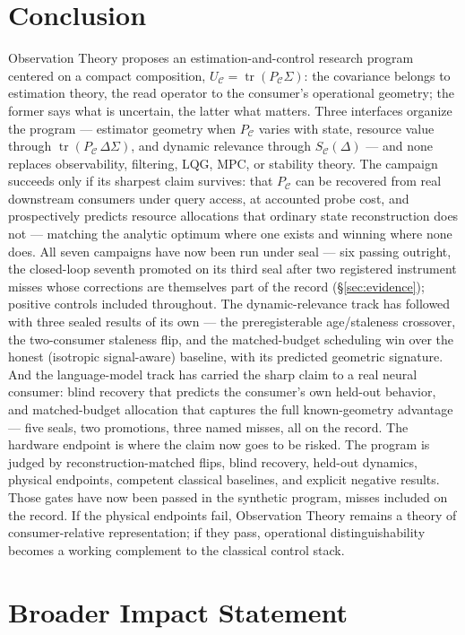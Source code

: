 \documentclass{article}
\theoremstyle{definition}
\theoremstyle{remark}
\newcommand{\PC}{P_{\mathcal{C}}}
\newcommand{\tr}{\operatorname{tr}}
\newcommand{\Sig}{\Sigma}
\newcommand{\UC}{U_{\mathcal{C}}}
\newcommand{\SC}{S_{\mathcal{C}}}
\begin{document}
\section{Conclusion}
\label{sec:conclusion}

Observation Theory proposes an estimation-and-control research program
centered on a compact composition, $\UC=\tr(\PC\Sig)$: the covariance
belongs to estimation theory, the read operator to the consumer's
operational geometry; the former says what is uncertain, the latter what
matters. Three interfaces organize the program --- estimator geometry when
$\PC$ varies with state, resource value through $\tr(\PC\,\Delta\Sig)$, and
dynamic relevance through $\SC(\Delta)$ --- and none replaces observability,
filtering, LQG, MPC, or stability theory. The campaign succeeds only if its
sharpest claim survives: that $\PC$ can be recovered from real downstream
consumers under query access, at accounted probe cost, and prospectively
predicts resource allocations that ordinary state reconstruction does not
--- matching the analytic optimum where one exists and winning where none
does. All seven campaigns have now been run under seal --- six passing
outright, the closed-loop seventh promoted on its third seal after two
registered instrument misses whose corrections are themselves part of the
record (\S\ref{sec:evidence}); positive controls included throughout.
The dynamic-relevance track has followed with three sealed results of
its own --- the preregisterable age/staleness crossover, the
two-consumer staleness flip, and the matched-budget scheduling win over
the honest (isotropic signal-aware) baseline, with its predicted
geometric signature. And the language-model track has carried the
sharp claim to a real neural consumer: blind recovery that predicts
the consumer's own held-out behavior, and matched-budget allocation
that captures the full known-geometry advantage --- five seals, two
promotions, three named misses, all on the record. The hardware
endpoint is where the claim now goes to be risked.
The program is judged by reconstruction-matched flips, blind recovery,
held-out dynamics, physical endpoints, competent classical baselines, and
explicit negative results. Those gates have now been passed in the
synthetic program, misses included on the record. If the physical
endpoints fail, Observation Theory remains a theory of consumer-relative
representation; if they pass, operational distinguishability becomes a
working complement to the classical control stack.


\section*{Broader Impact Statement}
\end{document}
